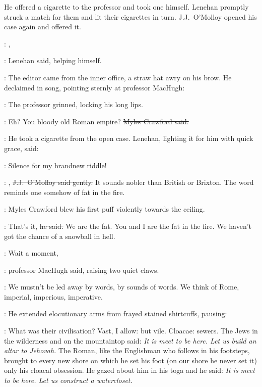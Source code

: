 
He offered a cigarette to the professor and took one himself.
Lenehan promptly struck a match for them and lit their cigarettes in turn.
J.J.~O'Molloy opened his case again and offered it.

\lenehan:
,

:
Lenehan said,
helping himself.

:
The editor came from the inner office,
a straw hat awry on his brow.
He declaimed in song,
pointing sternly at professor MacHugh:



:
The professor grinned,
locking his long lips.

\crawford:
Eh?
You bloody old Roman empire?
\sout{Myles Crawford said.}

:
He took a cigarette from the open case.
Lenehan,
lighting it for him with quick grace,
said:

\lenehan:
Silence for my brandnew riddle!

\jjom:
,
\sout{J.J.~O'Molloy said gently.}
It sounds nobler than British or Brixton.
The word reminds one somehow of fat in the fire.

:
Myles Crawford blew his first puff violently towards the ceiling.

\crawford:
That's it,
\sout{he said.}
We are the fat.
You and I are the fat in the fire.
We haven't got the chance of a snowball in hell.



\machugh:
Wait a moment,

:
professor MacHugh said,
raising two quiet claws.

\machugh:
We mustn't be led away by words,
by sounds of words.
We think of Rome,
imperial, imperious, imperative.

:
He extended elocutionary arms from frayed stained shirtcuffs,
pausing:

\machugh:
What was their civilisation?
Vast, I allow:
but vile.
Cloacae: sewers.
The Jews in the wilderness and on the mountaintop said:
\emph{It is meet to be here.
Let us build an altar to Jehovah.}
The Roman,
like the Englishman who follows in his footsteps,
brought to every new shore on which he set his foot
(on our shore he never set it)
only his cloacal obsession.
He gazed about him in his toga
and he said:
\emph{It is meet to be here.
Let us construct a watercloset.}

